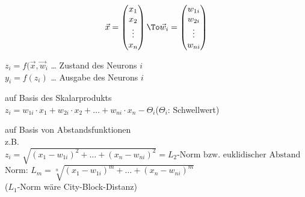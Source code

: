 $$\vec{x} = \begin{pmatrix}
x_1 \\ x_2 \\ \vdots \\ x_n
\end{pmatrix}
\To
\vec{w}_i=
\begin{pmatrix}
w_{1i}\\
w_{2i}\\
\vdots\\
w_{ni}
\end{pmatrix}
$$

$z_i=f(\vec{x}, \vec{w}_i$ … Zustand des Neurons $i$\\
$y_i=f(z_i)$ … Ausgabe des Neurons $i$

\begin{anumerate}
\item auf Basis des Skalarprodukts\\
$z_i = w_{1i} \cdot x_1 + w_{2i}\cdot x_2 + \ldots + w_{ni}\cdot x_n - \Theta_i$\quad($\Theta_i$: Schwellwert)
\item auf Basis von Abstandsfunktionen\\
z.B. $z_i=\sqrt{(x_1-w_{1i})^2+\ldots+(x_n-w_{ni})^2}= L_2\text{-Norm bzw. euklidischer Abstand}$\\
Norm: $L_m=\sqrt[n]{(x_1-w_{1i})^m+\ldots+(x_n-w_{ni})^m}$\\
($L_1$-Norm wäre City-Block-Distanz)
\end{anumerate}

